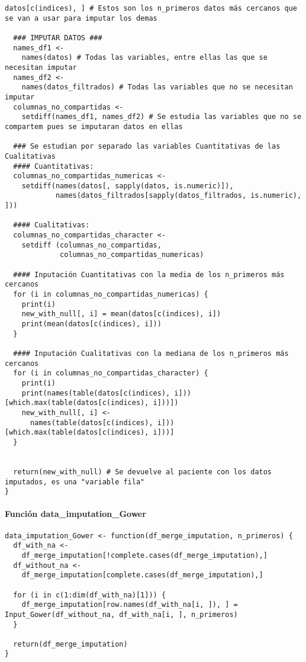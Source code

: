 \begin{lstlisting}[style=mystyle,caption={Input\_Gower.R}, label={lst:input-gower-fun}]
  datos[c(indices), ] # Estos son los n_primeros datos más cercanos que se van a usar para imputar los demas
  
  ### IMPUTAR DATOS ###
  names_df1 <-
    names(datos) # Todas las variables, entre ellas las que se necesitan imputar
  names_df2 <-
    names(datos_filtrados) # Todas las variables que no se necesitan imputar
  columnas_no_compartidas <-
    setdiff(names_df1, names_df2) # Se estudia las variables que no se compartem pues se imputaran datos en ellas
  
  ### Se estudian por separado las variables Cuantitativas de las Cualitativas
  #### Cuantitativas:
  columnas_no_compartidas_numericas <-
    setdiff(names(datos[, sapply(datos, is.numeric)]),
            names(datos_filtrados[sapply(datos_filtrados, is.numeric), ]))
  
  #### Cualitativas:
  columnas_no_compartidas_character <-
    setdiff (columnas_no_compartidas,
             columnas_no_compartidas_numericas)
  
  #### Inputación Cuantitativas con la media de los n_primeros más cercanos
  for (i in columnas_no_compartidas_numericas) {
    print(i)
    new_with_null[, i] = mean(datos[c(indices), i])
    print(mean(datos[c(indices), i]))
  }
  
  #### Inputación Cualitativas con la mediana de los n_primeros más cercanos
  for (i in columnas_no_compartidas_character) {
    print(i)
    print(names(table(datos[c(indices), i]))[which.max(table(datos[c(indices), i]))])
    new_with_null[, i] <-
      names(table(datos[c(indices), i]))[which.max(table(datos[c(indices), i]))]
  }
  
  
  return(new_with_null) # Se devuelve al paciente con los datos imputados, es una "variable fila"
}
\end{lstlisting}


\newpage

\paragraph*{Función data\_imputation\_Gower}\label{sec:codigo-input-gower-fun-preprocesamiento}
\begin{lstlisting}[style=mystyle,caption={data\_imputation\_Gower.R}, label={lst:input-gower-fun-preprocesamiento}]
  data_imputation_Gower <- function(df_merge_imputation, n_primeros) {
  df_with_na <-
    df_merge_imputation[!complete.cases(df_merge_imputation),]
  df_without_na <-
    df_merge_imputation[complete.cases(df_merge_imputation),]
  
  for (i in c(1:dim(df_with_na)[1])) {
    df_merge_imputation[row.names(df_with_na[i, ]), ] = Input_Gower(df_without_na, df_with_na[i, ], n_primeros)
  }
  
  return(df_merge_imputation)
}
\end{lstlisting}

\vspace{-5pt}
